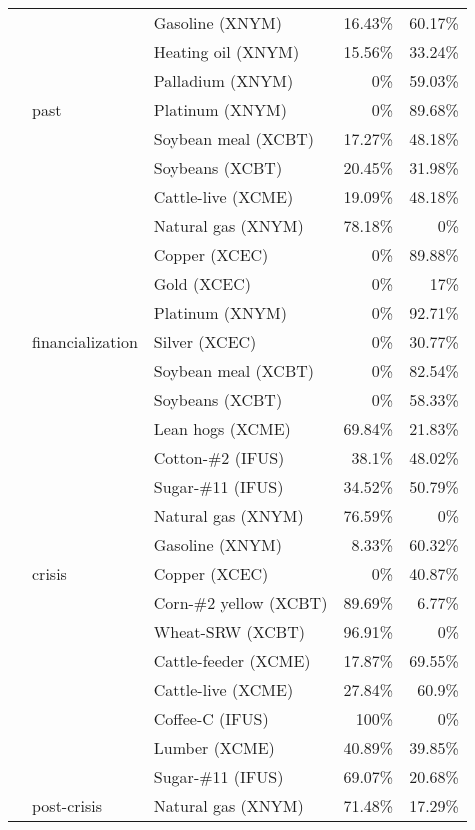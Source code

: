 \documentclass[]{elsarticle} %
\begin{document}
\begin{longtable}[t]{>{}lllrr}
 &  & Gasoline (XNYM) & 16.43\% & 60.17\%\\
\nopagebreak
 &  & Heating oil (XNYM) & 15.56\% & 33.24\%\\
\nopagebreak
 &  & Palladium (XNYM) & 0\% & 59.03\%\\
\nopagebreak
 & \multirow[t]{-8}{*}{\raggedright\arraybackslash past} & Platinum (XNYM) & 0\% & 89.68\%\\
\nopagebreak
 &  & Soybean meal (XCBT) & 17.27\% & 48.18\%\\
\nopagebreak
 &  & Soybeans (XCBT) & 20.45\% & 31.98\%\\
\nopagebreak
 &  & Cattle-live (XCME) & 19.09\% & 48.18\%\\
\nopagebreak
 &  & Natural gas (XNYM) & 78.18\% & 0\%\\
\nopagebreak
 &  & Copper (XCEC) & 0\% & 89.88\%\\
\nopagebreak
 &  & Gold (XCEC) & 0\% & 17\%\\
\nopagebreak
 &  & Platinum (XNYM) & 0\% & 92.71\%\\
\nopagebreak
 & \multirow[t]{-8}{*}{\raggedright\arraybackslash financialization} & Silver (XCEC) & 0\% & 30.77\%\\
\nopagebreak
 &  & Soybean meal (XCBT) & 0\% & 82.54\%\\
\nopagebreak
 &  & Soybeans (XCBT) & 0\% & 58.33\%\\
\nopagebreak
 &  & Lean hogs (XCME) & 69.84\% & 21.83\%\\
\nopagebreak
 &  & Cotton-\#2 (IFUS) & 38.1\% & 48.02\%\\
\nopagebreak
 &  & Sugar-\#11 (IFUS) & 34.52\% & 50.79\%\\
\nopagebreak
 &  & Natural gas (XNYM) & 76.59\% & 0\%\\
\nopagebreak
 &  & Gasoline (XNYM) & 8.33\% & 60.32\%\\
\nopagebreak
 & \multirow[t]{-8}{*}{\raggedright\arraybackslash crisis} & Copper (XCEC) & 0\% & 40.87\%\\
\nopagebreak
 &  & Corn-\#2 yellow (XCBT) & 89.69\% & 6.77\%\\
\nopagebreak
 &  & Wheat-SRW (XCBT) & 96.91\% & 0\%\\
\nopagebreak
 &  & Cattle-feeder (XCME) & 17.87\% & 69.55\%\\
\nopagebreak
 &  & Cattle-live (XCME) & 27.84\% & 60.9\%\\
\nopagebreak
 &  & Coffee-C (IFUS) & 100\% & 0\%\\
\nopagebreak
 &  & Lumber (XCME) & 40.89\% & 39.85\%\\
\nopagebreak
 &  & Sugar-\#11 (IFUS) & 69.07\% & 20.68\%\\
\nopagebreak
\multirow[t]{-32}{*}{\raggedright\arraybackslash \textbf{term structure}} & \multirow[t]{-8}{*}{\raggedright\arraybackslash post-crisis} & Natural gas (XNYM) & 71.48\% & 17.29\%\\*
\end{longtable}
\endgroup{}
\end{document}

